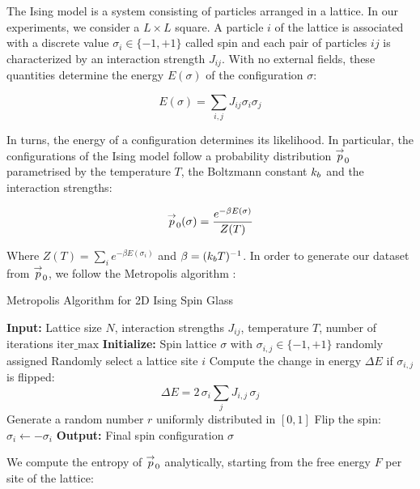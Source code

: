 The Ising model is a system consisting of particles arranged in a lattice. In our experiments, we consider a $L\times L$ square. A particle $i$ of the lattice is associated with a discrete value $\sigma_{i}\in\{-1,+1\}$ called spin and each pair of particles $ij$ is characterized by an interaction strength $J_{ij}$. With no external fields, these quantities determine the energy $E(\sigma)$ of the configuration $\sigma$: 

\begin{equation}
E(\sigma)=\sum_{i,j}J_{ij}\sigma_i\sigma_j
\end{equation}

In turns, the energy of a configuration determines its likelihood. In particular, the configurations of the Ising model follow a probability distribution $\overset{\rightarrow}{p}_0$ parametrised by the temperature $T$, the Boltzmann constant $k_b$ and the interaction strengths:

\begin{equation}
    \overset{\rightarrow}{p}_0(\sigma) = \frac{e^{-\beta E(\sigma)}}{Z(T)}
\end{equation}

Where $Z(T)=\sum_{i}e^{-\beta E(\sigma_i)}$ and $\beta=(k_b T)^{-1}$. In order to generate our dataset from $\overset{\rightarrow}{p}_0$, we follow the Metropolis algorithm \citep{bhanot1988metropolis}:

\begin{algorithm}[H]
\caption{Metropolis Algorithm for 2D Ising Spin Glass}
\begin{algorithmic}[1]
\STATE \textbf{Input:} Lattice size \( N \), interaction strengths \( J_{ij} \), temperature \( T \), number of iterations \( \text{iter\_max} \)
\STATE \textbf{Initialize:} Spin lattice \( \sigma \) with \( \sigma_{i,j} \in \{-1, +1\} \) randomly assigned
    \STATE Randomly select a lattice site \(i \)
    \STATE Compute the change in energy \( \Delta E \) if \( \sigma_{i,j} \) is flipped:
    \[
    \Delta E = 2 \, \sigma_i \sum_{j} J_{i,j} \, \sigma_{j}
    \]
    \STATE Generate a random number \( r \) uniformly distributed in \( [0, 1] \)
        \STATE Flip the spin: \( \sigma_i \leftarrow -\sigma_i \)
    \ENDIF
\ENDFOR
\STATE \textbf{Output:} Final spin configuration \( \sigma \)
\end{algorithmic}
\end{algorithm}

We compute the entropy of $\overset{\rightarrow}{p}_0$ analytically, starting from the free energy $F$ per site of the lattice:

